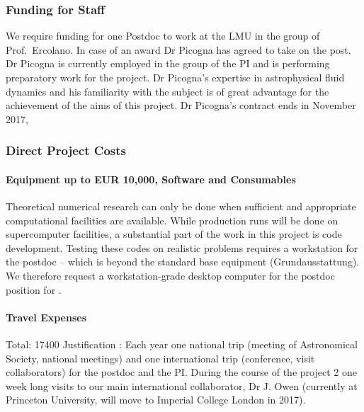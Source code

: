 \documentclass[10pt,fleqn,twoside]{article}
\begin{document}
\subsubsection{Funding for Staff}

We require funding for one Postdoc to work at the LMU in the group of
Prof.\ Ercolano. In case of an award Dr Picogna has agreed to
take on the post. Dr Picogna is currently employed in the group of the
PI and is performing preparatory work for the project. Dr Picogna's
expertise in astrophysical fluid dynamics and his familiarity with the
subject is of great advantage for the achievement of the aims of this
project. Dr Picogna's contract ends in November 2017, 

\subsubsection{Direct Project Costs}


\paragraph{Equipment up to EUR 10,000, Software and Consumables}

Theoretical numerical research can only be done when sufficient and
appropriate computational facilities are available. While production
runs will be done on supercomputer facilities, a substantial part of
the work in this project is code development. Testing these codes on
realistic problems requires a workstation for the postdoc -- which is
beyond the standard base equipment 
(Grundausstattung). We therefore request a workstation-grade desktop
computer for the postdoc position for .

\paragraph{Travel Expenses}

Total: 17400 \EUR{} Justification : 
Each year one national trip (meeting of Astronomical Society, national
meetings) and one international trip (conference, visit
collaborators) for the postdoc and the PI. 
During the course of the project 2 one week long visits to our main
international collaborator, Dr J. Owen (currently at Princeton
University, will move to Imperial College London in 2017).
\end{document}
